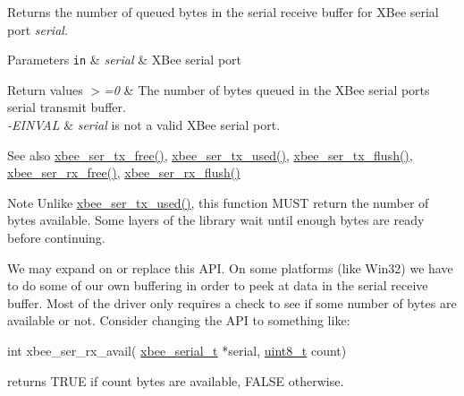 Returns the number of queued bytes in the serial receive buffer for X\+Bee serial port {\itshape serial}. 


\begin{DoxyParams}[1]{Parameters}
\mbox{\tt in}  & {\em serial} & X\+Bee serial port\\
\hline
\end{DoxyParams}

\begin{DoxyRetVals}{Return values}
{\em $>$=0} & The number of bytes queued in the X\+Bee serial port\textquotesingle{}s serial transmit buffer. \\
\hline
{\em -\/\+E\+I\+N\+V\+AL} & {\itshape serial} is not a valid X\+Bee serial port.\\
\hline
\end{DoxyRetVals}
\begin{DoxySeeAlso}{See also}
\hyperlink{group__xbee__serial_ga3ad8f378b572d6fec982f1086bd3b94f}{xbee\+\_\+ser\+\_\+tx\+\_\+free()}, \hyperlink{group__xbee__serial_gaabf70934d186354cde4ac14ed27d1bd2}{xbee\+\_\+ser\+\_\+tx\+\_\+used()}, \hyperlink{group__xbee__serial_ga05308d37301d27715f1e1308b7189220}{xbee\+\_\+ser\+\_\+tx\+\_\+flush()}, \hyperlink{group__xbee__serial_ga16fb431a1e66861439518e562431821f}{xbee\+\_\+ser\+\_\+rx\+\_\+free()}, \hyperlink{group__xbee__serial_ga98a6d5ceb5e1445e8ef82ccaa65a8c15}{xbee\+\_\+ser\+\_\+rx\+\_\+flush()}
\end{DoxySeeAlso}
\begin{DoxyNote}{Note}
Unlike \hyperlink{group__xbee__serial_gaabf70934d186354cde4ac14ed27d1bd2}{xbee\+\_\+ser\+\_\+tx\+\_\+used()}, this function M\+U\+ST return the number of bytes available. Some layers of the library wait until enough bytes are ready before continuing.
\end{DoxyNote}
We may expand on or replace this A\+PI. On some platforms (like Win32) we have to do some of our own buffering in order to peek at data in the serial receive buffer. Most of the driver only requires a check to see if some number of bytes are available or not. Consider changing the A\+PI to something like\+:


\begin{DoxyCode}
\textcolor{keywordtype}{int} xbee\_ser\_rx\_avail( \hyperlink{structxbee__serial__t}{xbee\_serial\_t} *serial, \hyperlink{group__hal__dos_gae1affc9ca37cfb624959c866a73f83c2}{uint8\_t} count)
\end{DoxyCode}
 returns T\+R\+UE if {\ttfamily count} bytes are available, F\+A\+L\+SE otherwise. \mbox{\label{group__hal__hcs08_gad1b1f9f42e58d8299ddcca1c9cb3c5e8}} 
